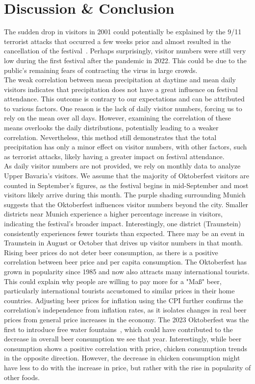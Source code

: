 \documentclass{article}
\theoremstyle{plain}
\theoremstyle{definition}
\theoremstyle{remark}
\begin{document}
\section{Discussion \& Conclusion}\label{sec:conclusion}
The sudden drop in visitors in 2001 could potentially be explained by the 9/11 terrorist attacks that occurred a few weeks prior and almost resulted in the cancellation of the festival~\citep{9}. Perhaps surprisingly, visitor numbers were still very low during the first festival after the pandemic in 2022. This could be due to the public's remaining fears of contracting the virus in large crowds.\\
The weak correlation between mean precipitation at daytime and mean daily visitors indicates that precipitation does not have a great influence on festival attendance. This outcome is contrary to our expectations and can be attributed to various factors. One reason is the lack of daily visitor numbers, forcing us to rely on the mean over all days. However, examining the correlation of these means overlooks the daily distributions, potentially leading to a weaker correlation. Nevertheless, this method still demonstrates that the total precipitation has only a minor effect on visitor numbers, with other factors, such as terrorist attacks, likely having a greater impact on festival attendance.\\
As daily visitor numbers are not provided, we rely on monthly data to analyze Upper Bavaria's visitors. We assume that the majority of Oktoberfest visitors are counted in September's figures, as the festival begins in mid-September and most visitors likely arrive during this month. The purple shading surrounding Munich suggests that the Oktoberfest influences visitor numbers beyond the city. Smaller districts near Munich experience a higher percentage increase in visitors, indicating the festival's broader impact. Interestingly, one district (Traunstein) consistently experiences fewer tourists than expected. There may be an event in Traunstein in August or October that drives up visitor numbers in that month.\\
Rising beer prices do not deter beer consumption, as there is a positive correlation between beer price and per capita consumption. The Oktoberfest has grown in popularity since 1985 and now also attracts many international tourists. This could explain why people are willing to pay more for a "Maß" beer, particularly international tourists accustomed to similar prices in their home countries. Adjusting beer prices for inflation using the CPI further confirms the correlation's independence from inflation rates, as it isolates changes in real beer prices from general price increases in the economy. The 2023 Oktoberfest was the first to introduce free water fountains~\citep{8}, which could have contributed to the decrease in overall beer consumption we see that year. Interestingly, while beer consumption shows a positive correlation with price, chicken consumption trends in the opposite direction. However, the decrease in chicken consumption might have less to do with the increase in price, but rather with the rise in popularity of other foods.\\
\end{document}
